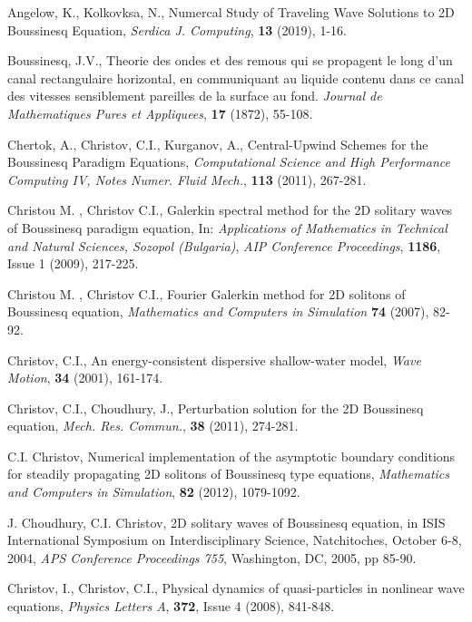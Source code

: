 \documentclass{article}
\begin{document}
\begin{thebibliography}{99}

 Angelow, K., Kolkovksa, N., Numercal Study of Traveling Wave Solutions to 2D Boussinesq Equation, {\it Serdica J. Computing}, \textbf{13} (2019), 1-16.

 Boussinesq, J.V., Theorie des ondes et des remous qui se propagent le long d'un canal rectangulaire horizontal, en communiquant au liquide contenu dans ce canal des vitesses sensiblement pareilles de la surface au fond.  {\it Journal de Mathematiques Pures et Appliquees}, \textbf{17} (1872), 55-108.

 Chertok, A., Christov, C.I., Kurganov, A., Central-Upwind Schemes for the Boussinesq Paradigm Equations,
{\it Computational Science and High Performance Computing IV, Notes Numer. Fluid Mech.}, \textbf{113} (2011), 267-281.

  Christou M. , Christov C.I.,
Galerkin spectral method for the 2D solitary waves of Boussinesq paradigm equation,
In: {\it Applications of Mathematics in Technical and Natural Sciences, Sozopol (Bulgaria)},
\emph{AIP Conference Proceedings}, \textbf{1186}, Issue 1 (2009), 217-225.

  Christou M. , Christov C.I.,
Fourier Galerkin method for 2D solitons of Boussinesq equation,
{\it Mathematics and Computers in Simulation} \textbf{74} (2007), 82-92.

 Christov, C.I., An energy-consistent dispersive shallow-water model,  {\it Wave Motion}, \textbf{34} (2001), 161-174.

 Christov, C.I., Choudhury, J., Perturbation solution for the 2D Boussinesq equation, {\it Mech. Res. Commun.}, \textbf{38} (2011), 274-281.

  C.I. Christov,
Numerical implementation of the asymptotic boundary conditions for steadily propagating 2D solitons of Boussinesq type equations,
{\it Mathematics and Computers in Simulation}, \textbf{82} (2012), 1079-1092.

  J. Choudhury, C.I. Christov,
2D solitary waves of Boussinesq equation, in ISIS International Symposium on Interdisciplinary Science, Natchitoches, October 6-8, 2004, {\it APS Conference Proceedings 755}, Washington, DC, 2005, pp 85-90.

 Christov, I., Christov, C.I., Physical dynamics of quasi-particles in nonlinear wave equations,
{\it Physics Letters A}, \textbf{372}, Issue 4 (2008),  841-848.


\end{thebibliography}
\end{document}
